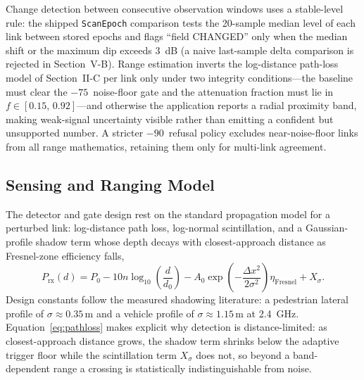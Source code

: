 \documentclass[journal,10pt]{IEEEtran}
\newcommand{\dBm}{\text{dBm}}
\begin{document}
Change detection between consecutive observation windows uses a stable-level
rule: the shipped \texttt{ScanEpoch} comparison tests the 20-sample median
level of each link between stored epochs and flags ``field CHANGED'' only when
the median shift or the maximum dip exceeds 3~dB (a naive last-sample delta
comparison is rejected in Section~V-B). Range estimation inverts the
log-distance path-loss model of Section~II-C per link only under two
integrity conditions---the baseline must clear the $-75$\,\dBm{} noise-floor
gate and the attenuation fraction must lie in $f \in [0.15,\,0.92]$---and
otherwise the application reports a radial proximity band, making weak-signal
uncertainty visible rather than emitting a confident but unsupported number. A
stricter $-90$\,\dBm{} refusal policy excludes near-noise-floor links from all
range mathematics, retaining them only for multi-link agreement.

\subsection{Sensing and Ranging Model}
\label{sec:model}
The detector and gate design rest on the standard propagation model for a
perturbed link: log-distance path loss, log-normal scintillation, and a
Gaussian-profile shadow term whose depth decays with closest-approach
distance as Fresnel-zone efficiency falls,
{\small
\begin{equation}
P_{\mathrm{rx}}(d) = P_0 - 10n \log_{10}\left(\frac{d}{d_0}\right) - A_0 \exp\left(-\frac{\Delta x^2}{2\sigma^2}\right) \eta_{\mathrm{Fresnel}} + X_\sigma .
\label{eq:pathloss}
\end{equation}}
Design constants follow the measured shadowing literature: a pedestrian
lateral profile of $\sigma \approx 0.35$\,m and a vehicle profile of
$\sigma \approx 1.15$\,m at 2.4~GHz. Equation~\eqref{eq:pathloss} makes
explicit why detection is distance-limited: as closest-approach distance
grows, the shadow term shrinks below the adaptive trigger floor while the
scintillation term $X_\sigma$ does not, so beyond a band-dependent range a
crossing is statistically indistinguishable from noise.
\end{document}
